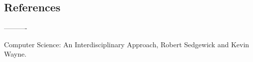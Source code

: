 


















		



\subsection{References}
----------

Computer Science: An Interdisciplinary Approach, Robert Sedgewick and Kevin Wayne.
